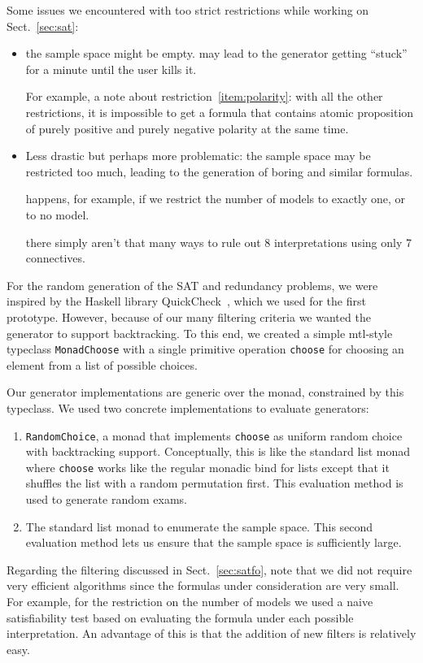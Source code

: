 Some issues we encountered with too strict restrictions
while working on Sect.~\ref{sec:sat}:
\begin{itemize}
    \item
        the sample space might be empty.
        may lead to the generator getting ``stuck'' for a minute until the user kills it.

        For example, a note about restriction~\ref{item:polarity}:
        with all the other restrictions,
        it is impossible to get a formula that contains atomic proposition
        of purely positive and purely negative polarity at the same time.

    \item
        Less drastic but perhaps more problematic:
        the sample space may be restricted too much,
        leading to the generation of boring and similar formulas.

        happens, for example, if we restrict the number of models to exactly one,
        or to no model.

        there simply aren't that many ways to rule out 8 interpretations
        using only 7 connectives.
\end{itemize}






For the random generation of the SAT and redundancy problems,
we were inspired by the Haskell library QuickCheck~\cite{ClaessenHughes:2000:QuickCheck},
which we used for the first prototype.
However, because of our many filtering criteria we wanted the generator to support backtracking.
To this end,
we created a simple mtl-style typeclass \texttt{MonadChoose}
with a single primitive operation \texttt{choose} for choosing an element from a list of possible choices.

Our generator implementations are generic over the monad, constrained by this typeclass.
We used two concrete implementations to evaluate generators:
\begin{enumerate}
    \item
        \texttt{RandomChoice}, a monad that implements \texttt{choose}
        as uniform random choice with backtracking support.
        Conceptually, this is like the standard list monad
        where \texttt{choose} works like the regular monadic bind for lists
        except that it shuffles the list with a random permutation first.
        This evaluation method is used to generate random exams.
    \item
        The standard list monad to enumerate the sample space.
        This second evaluation method lets us ensure that the sample space is sufficiently large.
\end{enumerate}

Regarding the filtering discussed in Sect.~\ref{sec:satfo},
note that we did not require very efficient algorithms since
the formulas under consideration are very small.
For example, for the restriction on the number of models we used a naive satisfiability test
based on evaluating the formula under each possible interpretation.
An advantage of this is that the addition of new filters is relatively easy.
